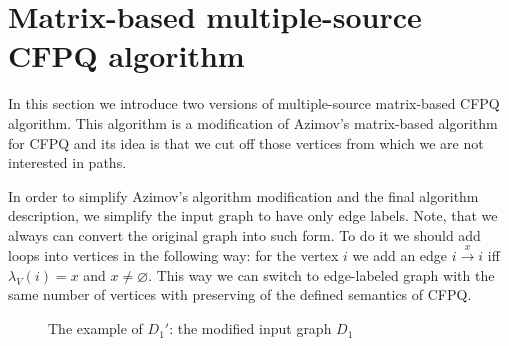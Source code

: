 \section{Matrix-based multiple-source CFPQ algorithm}
\label{sec:multiple-source-algo}

 In this section we introduce two versions of multiple-source matrix-based CFPQ algorithm.
 This algorithm is a modification of Azimov's matrix-based algorithm for CFPQ and its idea is that we cut off those vertices from which we are not interested in paths.
 

In order to simplify Azimov's algorithm modification and the final algorithm description, we simplify the input graph to have only edge labels.
Note, that we always can convert the original graph into such form. 
To do it we should add loops into vertices in the following way: for the vertex $i$ we add an edge $i \xrightarrow{x} i$ iff $\lambda_V(i) = x$ and $x\neq \varnothing$.
This way we can switch to edge-labeled graph with the same number of vertices with preserving of the defined semantics of CFPQ.

\begin{figure}[h]
    \centering        
    \caption{The example of $D_1'$: the modified input graph $D_1$}
    \label{fig:example_modified_input_graph}
\end{figure}

